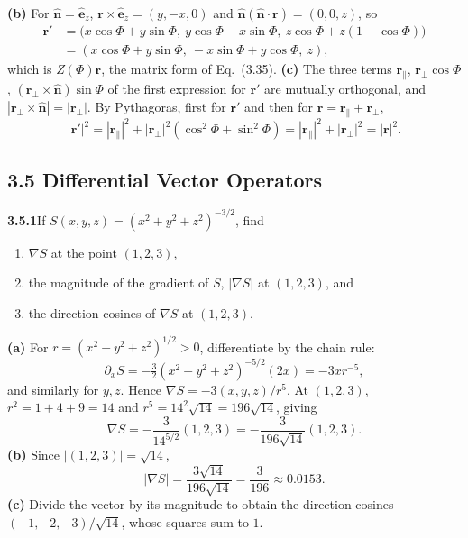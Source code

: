\textbf{(b)} For $\hat{\mathbf n}=\hat{\mathbf e}_z$,
$\mathbf r\times\hat{\mathbf e}_z=(y,-x,0)$ and
$\hat{\mathbf n}(\hat{\mathbf n}\cdot\mathbf r)=(0,0,z)$, so
\[
\begin{aligned}
\mathbf r'&=\bigl(x\cos\Phi+y\sin\Phi,\ y\cos\Phi-x\sin\Phi,\
z\cos\Phi+z(1-\cos\Phi)\bigr)\\
&=(x\cos\Phi+y\sin\Phi,\ -x\sin\Phi+y\cos\Phi,\ z),
\end{aligned}
\]
which is $Z(\Phi)\mathbf r$, the matrix form of Eq.~(3.35).
\textbf{(c)} The three terms $\mathbf r_\parallel$,
$\mathbf r_\perp\cos\Phi$, $(\mathbf r_\perp\times\hat{\mathbf n})\sin\Phi$
of the first expression for $\mathbf r'$ are mutually orthogonal, and
$|\mathbf r_\perp\times\hat{\mathbf n}|=|\mathbf r_\perp|$.
By Pythagoras, first for $\mathbf r'$ and then for
$\mathbf r=\mathbf r_\parallel+\mathbf r_\perp$,
\[
|\mathbf r'|^2=|\mathbf r_\parallel|^2+
|\mathbf r_\perp|^2(\cos^2\Phi+\sin^2\Phi)
=|\mathbf r_\parallel|^2+|\mathbf r_\perp|^2=|\mathbf r|^2.
\]

\subsection*{3.5 Differential Vector Operators}

\par\bigskip
\noindent\textbf{3.5.1}\quad If
$S(x,y,z)=\left(x^{2}+y^{2}+z^{2}\right)^{-3/2}$, find
\begin{enumerate}
\item[(a)] $\nabla S$ at the point $(1,2,3)$,
\item[(b)] the magnitude of the gradient of $S$, $|\nabla S|$ at $(1,2,3)$,
  and
\item[(c)] the direction cosines of $\nabla S$ at $(1,2,3)$.
\end{enumerate}
\solution
\textbf{(a)} For $r=(x^2+y^2+z^2)^{1/2}>0$, differentiate by the chain
rule:
\[
\partial_x S=-\tfrac32(x^2+y^2+z^2)^{-5/2}(2x)
=-3xr^{-5},
\]
and similarly for $y,z$. Hence $\nabla S=-3(x,y,z)/r^5$.
At $(1,2,3)$, $r^2=1+4+9=14$ and $r^5=14^2\sqrt{14}=196\sqrt{14}$,
giving
\[
\boxed{\nabla S=-\frac3{14^{5/2}}(1,2,3)=-\frac{3}{196\sqrt{14}}(1,2,3)}.
\]
\textbf{(b)} Since $|(1,2,3)|=\sqrt{14}$,
\[
\boxed{|\nabla S|=\frac{3\sqrt{14}}{196\sqrt{14}}=\frac3{196}}
\approx0.0153.
\]
\textbf{(c)} Divide the vector by its magnitude to obtain the direction
cosines $\boxed{(-1,-2,-3)/\sqrt{14}}$, whose squares sum to $1$.

